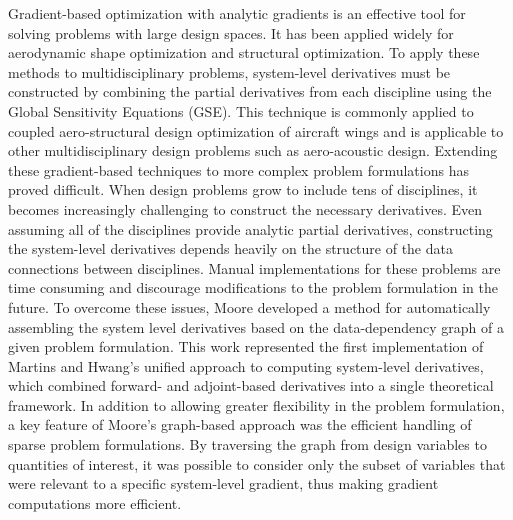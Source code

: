 \documentclass[]{aiaa-tc} %
\begin{document}
    Gradient-based optimization with analytic gradients is an effective tool for solving problems
    with large design spaces. It has been applied widely for aerodynamic shape optimization \cite{Liou2010,palacios2012adjoint}
    and structural optimization\cite{Kennedy:2013:TACS, Venkataraman:2004:SOC, Adelman:1986:structure-sensitivity}.
    To apply these methods to multidisciplinary problems, system-level derivatives must be
    constructed by combining the partial derivatives from each discipline using the Global Sensitivity
    Equations\cite{Sobieski1990} (GSE). This technique is commonly applied to coupled
    aero-structural design optimization of aircraft wings\cite{Kenway2012c, Haghighat2012} and is applicable to
    other multidisciplinary design problems such as aero-acoustic design\cite{economon2012coupled}. Extending these
    gradient-based techniques to more complex problem formulations has proved difficult. When
    design problems grow to include tens of disciplines, it becomes increasingly challenging to construct the
    necessary derivatives. Even assuming all of the disciplines provide analytic partial derivatives,
    constructing the system-level derivatives depends heavily on the structure of the data connections
    between disciplines. Manual implementations for these problems are time consuming and discourage modifications
    to the problem formulation in the future. To overcome these issues, Moore developed a method for automatically assembling the system
    level derivatives based on the data-dependency graph of a given problem formulation\cite{openmdao_derivatives}. This
    work represented the first implementation of Martins and Hwang's unified approach to computing system-level derivatives,
    which combined forward- and adjoint-based derivatives into a single theoretical framework\cite{martins2013}. 
    In addition to allowing greater flexibility in the problem formulation, a key feature of Moore's graph-based approach was the efficient
    handling of sparse problem formulations. By traversing the graph from design variables to quantities of interest,
    it was possible to consider only the subset of variables that were relevant to a specific system-level gradient, thus
    making gradient computations more efficient.
\end{document}
